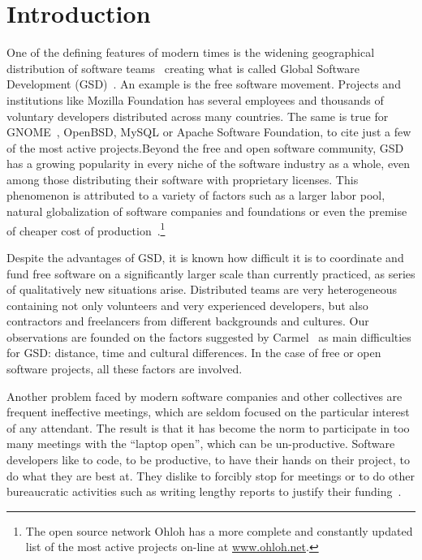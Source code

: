 \documentclass{article}
\newcommand{\indraftnote}[1]{}
\newcommand{\todo}[1]{\indraftnote{todo: #1}}
\begin{document}



\section{Introduction}

One of the defining features of modern times is the widening geographical
distribution of software teams~\cite{last2003} creating what is called Global
Software Development (GSD)~\cite{german2003,Fryer,Begel}.  
An example is the free software movement. Projects and institutions like Mozilla
Foundation has several employees and thousands of voluntary developers
distributed across many countries. The same is true for GNOME~\cite{german2003},
OpenBSD, MySQL or Apache Software Foundation, to cite just a 
few of the most active projects.Beyond the free and open software community, GSD has a growing
popularity in every niche of the software industry as a whole, even among those
distributing their software with proprietary licenses. This phenomenon is
attributed to a variety of factors such as a larger labor pool, natural
globalization of software companies and foundations or even the premise of
cheaper cost of production~\cite{komi2005}.\footnote{The open source network Ohloh has a more complete
and constantly updated list of the most active projects on-line at
\url{www.ohloh.net}.}

Despite the advantages of GSD, it is known how
difficult it is to coordinate and fund free software on a significantly larger scale
than currently practiced, as series of qualitatively new situations arise. Distributed
teams are very heterogeneous containing not only volunteers and very experienced
developers, but also contractors and freelancers from different backgrounds and
cultures. Our observations are founded on the factors suggested by
Carmel~\cite{carmel1999} as main difficulties for GSD: distance, time and
cultural differences. In the case of free or open software projects, all these
factors are involved.

Another problem faced by modern software companies and other
collectives are frequent ineffective meetings, which are seldom
focused on the particular interest of any attendant. The result is that it has
become the norm to participate in too many meetings with the ``laptop
open'', which can be un-productive. Software developers
like to code, to be productive, to have their hands on their project,
to do what they are best at. They dislike to forcibly stop for meetings
or to do other bureaucratic activities such as writing lengthy reports to
justify their funding~\cite{Thompson:Wired:2012}.
\end{document}
